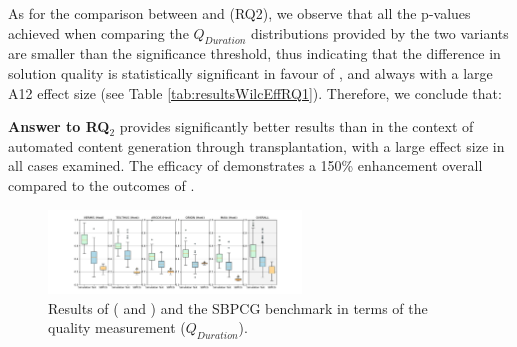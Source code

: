 As for the comparison between \simhotep{} and \timhotep{} (RQ2),  we observe that all the p-values achieved when comparing the $Q_{Duration}$ distributions provided by the two \ApproachName{} variants are smaller than the significance threshold, thus indicating that the difference in solution quality is statistically significant in favour of \simhotep{}, and always with a large A12 effect size (see Table \ref{tab:resultsWilcEffRQ1}). Therefore, we conclude that:

\noindent  \textbf{Answer to RQ$_2$} \simhotep{} provides significantly better results than \timhotep{} in the context of automated content generation through transplantation, with a large effect size in all cases examined. The efficacy of \simhotep{} demonstrates a 150\% enhancement overall compared to the outcomes of \timhotep{}.

\begin{figure}[tb]
    \centering
    \includegraphics[width=0.6\textwidth]{Figures/Imhotep_with_legend_and_oracle_average-v4.pdf}
    \caption{Results of \ApproachName{} (\simhotep{} and \timhotep{}) and the SBPCG benchmark in terms of the quality measurement ($Q_{Duration}$).}
    \label{fig:results}
\end{figure}